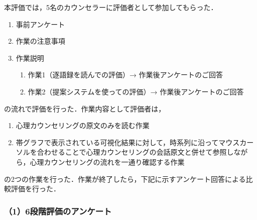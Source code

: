 \documentclass[shuuron]{kuee}
\begin{document}

本評価では，5名のカウンセラーに評価者として参加してもらった．



\begin{enumerate}

  \item 事前アンケート
  \item 作業の注意事項
  \item 作業説明
  \begin{enumerate}

    \item 作業1（逐語録を読んでの評価）→ 作業後アンケートのご回答
    \item 作業2（提案システムを使っての評価）→ 作業後アンケートのご回答
  \end{enumerate}
\end{enumerate}
の流れで評価を行った．作業内容として評価者は，
\begin{enumerate}

  \item 心理カウンセリングの原文のみを読む作業
  \item 帯グラフで表示されている可視化結果に対して，時系列に沿ってマウスカーソルを合わせることで心理カウンセリングの会話原文と併せて参照しながら，心理カウンセリングの流れを一通り確認する作業
\end{enumerate}
の2つの作業を行った．作業が終了したら，下記に示すアンケート回答による比較評価を行った．





\subsubsection{（1）6段階評価のアンケート}
\end{document}
